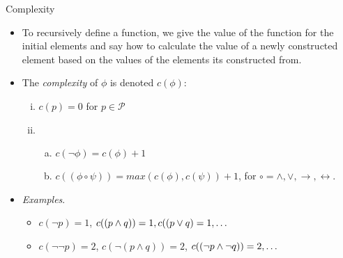 \begin{frame}{Complexity}

		\begin{itemize}
	
 		\item \alert{To recursively define a function, we give the value of the function for the initial elements and say how to calculate the value of a newly constructed element based on the values of the elements its constructed from.}
		
		\item The \emph{complexity} of $\phi$ is denoted $c(\phi)$:
		 \begin{enumerate}[(i)]
	
		\item $c(p)=0$ for $p\in\mathcal{P}$
		
		\item \begin{enumerate}[(a)]
		
			\item $c(\neg\phi)=c(\phi)+1$
			
			\item $c((\phi\circ\psi))=max(c(\phi), c(\psi))+1$, for $\circ=\land,\lor,\to,\leftrightarrow$.
		
		\end{enumerate}
		\end{enumerate}
		
		
		\item \emph{Examples}.
		
		 \begin{itemize}
	
		\item $c(\neg p)=1$, $c((p\land q))=1, c((p\lor q)=1, \mathellipsis$
		
		\item $c(\neg\neg p)=2$, $c(\neg (p\land q))=2$, $c((\neg p\land \neg q))=2, \mathellipsis$
	
	\end{itemize}
		
		
		\end{itemize}

\end{frame}

